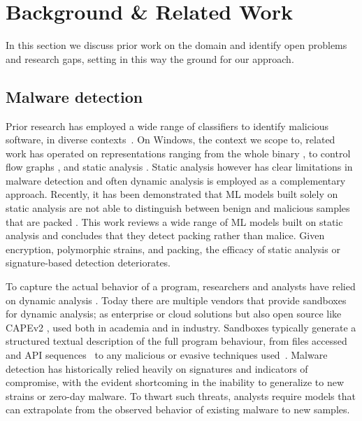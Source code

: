 \section{Background \& Related Work}
\label{sec:backgroundauto}
In this section we discuss prior work on the domain and identify open problems and research gaps, setting in this way the ground for our approach.

\subsection{Malware detection}
Prior research has employed a wide range of classifiers to identify malicious software, in diverse contexts~\cite{abusitta2021malware}. 
On Windows, the context we scope to, related work has operated on representations ranging from the whole binary \cite{raff2018malware}, to control flow graphs \cite{alasmary2020soteria}, and static analysis \cite{christodorescu2003static}.
Static analysis however has clear limitations in malware detection and often dynamic analysis is employed as a complementary approach.
Recently, it has been demonstrated that ML models built solely on static analysis are not able to distinguish between benign and malicious samples that are packed \cite{aghakhani2020malware}.
This work reviews a wide range of ML models built on static analysis and concludes that they detect packing rather than malice.
Given encryption, polymorphic strains, and packing, the efficacy of static analysis or signature-based detection deteriorates.

To capture the actual behavior of a program, researchers and analysts have relied on dynamic analysis \cite{cornelissen2009systematic}.
Today there are multiple vendors that provide sandboxes for dynamic analysis; as enterprise or cloud solutions but also open source like CAPEv2 \cite{CAPEv2,CUCKOO,DRAKVUF}, used both in academia and in industry.
Sandboxes typically generate a structured textual description of the full program behaviour, from files accessed and API sequences~\cite{rosenberg2018generic,rosenberg2021sequence,pennington2014glove} to any malicious or evasive techniques used~\cite{trinius2009malware,galloro2022systematical,maffia2021longitudinal}.
Malware detection has historically relied heavily on signatures and indicators of compromise, with the evident shortcoming in the inability to generalize to new strains or zero-day malware.
To thwart such threats, analysts require models that can extrapolate from the observed behavior of existing malware to new samples.

